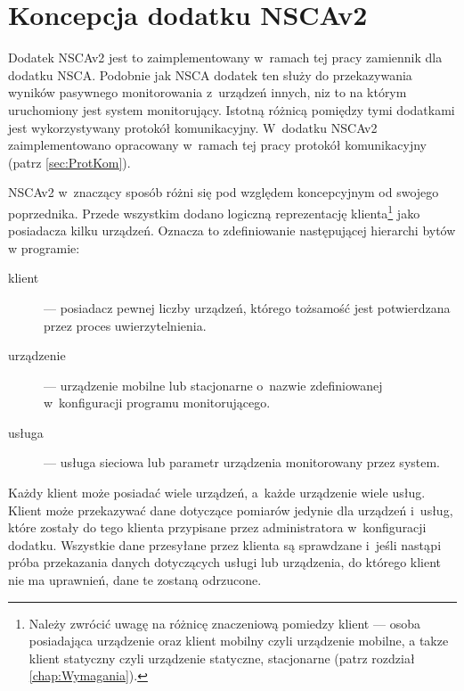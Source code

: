 \section[Koncepcja dodatku NSCAv2][Koncepcja dodatku NSCAv2]{Koncepcja
  dodatku NSCAv2}
\label{sec:ProjModOdb}

Dodatek NSCAv2 jest to zaimplementowany w~ramach tej pracy zamiennik
dla dodatku NSCA. Podobnie jak NSCA dodatek ten służy do przekazywania
wyników pasywnego monitorowania z~urządzeń innych, niz to na którym
uruchomiony jest system monitorujący. Istotną różnicą pomiędzy tymi
dodatkami jest wykorzystywany protokół komunikacyjny. W~dodatku NSCAv2
zaimplementowano opracowany w~ramach tej pracy protokół komunikacyjny
(patrz \ref{sec:ProtKom}).

NSCAv2 w~znaczący sposób różni się pod względem koncepcyjnym od
swojego poprzednika. Przede wszystkim dodano logiczną reprezentację
klienta\footnote{Należy zwrócić uwagę na różnicę znaczeniową pomiedzy
  klient --- osoba posiadająca urządzenie oraz klient mobilny
  czyli urządzenie mobilne, a takze klient statyczny czyli
  urządzenie statyczne, stacjonarne (patrz rozdział
  \ref{chap:Wymagania}).} jako posiadacza kilku urządzeń. Oznacza to
zdefiniowanie następującej hierarchi bytów w programie:

\begin{description}
\item[klient] --- posiadacz pewnej liczby urządzeń, którego tożsamość
  jest potwierdzana przez proces uwierzytelnienia.
\item[urządzenie] --- urządzenie mobilne lub stacjonarne o~nazwie
  zdefiniowanej w~konfiguracji programu monitorującego.
\item[usługa] --- usługa sieciowa lub parametr urządzenia monitorowany
  przez system.
\end{description}

Każdy klient może posiadać wiele urządzeń, a~każde urządzenie wiele
usług. Klient może przekazywać dane dotyczące pomiarów jedynie dla
urządzeń i~usług, które zostały do tego klienta przypisane przez
administratora w~konfiguracji dodatku. Wszystkie dane przesyłane przez
klienta są sprawdzane i~jeśli nastąpi próba przekazania danych
dotyczących usługi lub urządzenia, do którego klient nie ma uprawnień,
dane te zostaną odrzucone.

